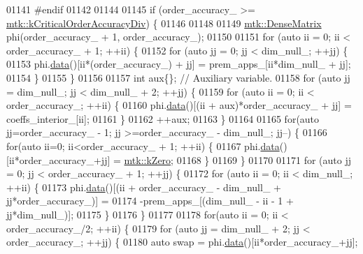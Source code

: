 \begin{DoxyCode}
{{01141 \textcolor{preprocessor}{  #endif}
01142 
01144 
01145   \textcolor{keywordflow}{if} (order\_accuracy\_ >= \hyperlink{group__c01-roots_ga0898eef2108473e44a5223932d571c31}{mtk::kCriticalOrderAccuracyDiv}) \{
01146 
01148 
01149     \hyperlink{classmtk_1_1DenseMatrix}{mtk::DenseMatrix} phi(order\_accuracy\_ + 1, order\_accuracy\_);
01150 
01151     \textcolor{keywordflow}{for} (\textcolor{keyword}{auto} ii = 0; ii < order\_accuracy\_ + 1; ++ii) \{
01152       \textcolor{keywordflow}{for} (\textcolor{keyword}{auto} jj = 0; jj < dim\_null\_; ++jj) \{
01153         phi.\hyperlink{classmtk_1_1DenseMatrix_a0c33b8a9e01d157c61ddbdf807c25d84}{data}()[ii*(order\_accuracy\_) + jj] = prem\_apps\_[ii*dim\_null\_ + jj];
01154       \}
01155     \}
01156 
01157     \textcolor{keywordtype}{int} aux\{\};  \textcolor{comment}{// Auxiliary variable.}
01158     \textcolor{keywordflow}{for} (\textcolor{keyword}{auto} jj = dim\_null\_; jj < dim\_null\_ + 2; ++jj) \{
01159       \textcolor{keywordflow}{for} (\textcolor{keyword}{auto} ii = 0; ii < order\_accuracy\_; ++ii) \{
01160         phi.\hyperlink{classmtk_1_1DenseMatrix_a0c33b8a9e01d157c61ddbdf807c25d84}{data}()[(ii + aux)*order\_accuracy\_ + jj] = coeffs\_interior\_[ii];
01161       \}
01162       ++aux;
01163     \}
01164 
01165     \textcolor{keywordflow}{for}(\textcolor{keyword}{auto} jj=order\_accuracy\_ - 1; jj >=order\_accuracy\_ - dim\_null\_; jj--) \{
01166       \textcolor{keywordflow}{for}(\textcolor{keyword}{auto} ii=0; ii<order\_accuracy\_ + 1; ++ii) \{
01167         phi.\hyperlink{classmtk_1_1DenseMatrix_a0c33b8a9e01d157c61ddbdf807c25d84}{data}()[ii*order\_accuracy\_+jj] = \hyperlink{group__c01-roots_ga59a451a5fae30d59649bcda274fea271}{mtk::kZero};
01168       \}
01169     \}
01170 
01171     \textcolor{keywordflow}{for} (\textcolor{keyword}{auto} jj = 0; jj < order\_accuracy\_ + 1; ++jj) \{
01172       \textcolor{keywordflow}{for} (\textcolor{keyword}{auto} ii = 0; ii < dim\_null\_; ++ii) \{
01173         phi.\hyperlink{classmtk_1_1DenseMatrix_a0c33b8a9e01d157c61ddbdf807c25d84}{data}()[(ii + order\_accuracy\_ - dim\_null\_ + jj*order\_accuracy\_)] =
01174           -prem\_apps\_[(dim\_null\_ - ii - 1 + jj*dim\_null\_)];
01175       \}
01176     \}
01177 
01178     \textcolor{keywordflow}{for}(\textcolor{keyword}{auto} ii = 0; ii < order\_accuracy\_/2; ++ii) \{
01179       \textcolor{keywordflow}{for} (\textcolor{keyword}{auto} jj = dim\_null\_ + 2; jj < order\_accuracy\_; ++jj) \{
01180         \textcolor{keyword}{auto} swap = phi.\hyperlink{classmtk_1_1DenseMatrix_a0c33b8a9e01d157c61ddbdf807c25d84}{data}()[ii*order\_accuracy\_+jj];
}}
\end{DoxyCode}
